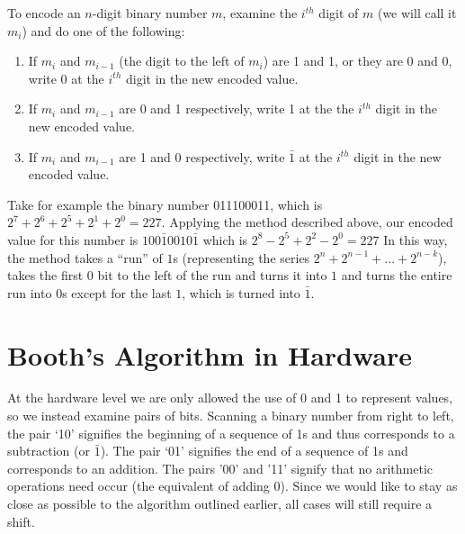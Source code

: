 \documentclass{article}
\begin{document}
To encode an $n$-digit binary number $m$, examine the $i^{th}$ digit of $m$ (we will call it $m_i$) and do one of the following: %

\begin{enumerate}
\item If $m_i$ and $m_{i-1}$ (the digit to the left of $m_i$) are 1 and 1, or they are 0 and 0, write 0 at the $i^{th}$ digit in the new encoded value.
\item If $m_i$ and $m_{i-1}$ are 0 and 1 respectively, write 1 at the the $i^{th}$ digit in the new encoded value.
\item If $m_i$ and $m_{i-1}$ are 1 and 0 respectively, write $\bar{1}$ at the $i^{th}$ digit in the new encoded value.
\end{enumerate}

Take for example the binary number 011100011, which is $2^7 + 2^6 + 2^5 + 2^1 + 2^0 = 227$.
Applying the method described above, our encoded value for this number is $100\bar{1}0010\bar{1}$ which is $2^8 - 2^5 + 2^2 - 2^0 = 227$
In this way, the method takes a ``run'' of $1$s (representing the series $2^{n} + 2^{n-1} + ...
+ 2^{n-k}$), takes the first 0 bit to the left of the run and turns it into $1$ and turns the entire run into $0$s except for the last $1$, which is turned into $\bar{1}$.



\section{Booth's Algorithm in Hardware}
    At the hardware level we are only allowed the use of 0 and 1 to represent values, so we instead examine pairs of bits.
Scanning a binary number from right to left, the pair `10' signifies the beginning of a sequence of 1s and thus corresponds to a subtraction (or $\bar{1}$).
The pair `01' signifies the end of a sequence of 1s and corresponds to an addition.
The pairs '00' and '11' signify that no arithmetic operations need occur (the equivalent of adding 0).
Since we would like to stay as close as possible to the algorithm outlined earlier, all cases will still require a shift.
\end{document}
